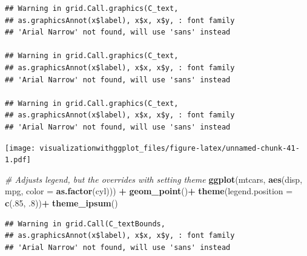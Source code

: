\documentclass[]{krantz}
\makeatletter
\newenvironment{Shaded}{\begin{snugshade}}{\end{snugshade}}
\newcommand{\CommentTok}[1]{\textcolor[rgb]{0.56,0.35,0.01}{\textit{#1}}}
\newcommand{\DataTypeTok}[1]{\textcolor[rgb]{0.13,0.29,0.53}{#1}}
\newcommand{\DecValTok}[1]{\textcolor[rgb]{0.00,0.00,0.81}{#1}}
\newcommand{\FloatTok}[1]{\textcolor[rgb]{0.00,0.00,0.81}{#1}}
\newcommand{\KeywordTok}[1]{\textcolor[rgb]{0.13,0.29,0.53}{\textbf{#1}}}
\newcommand{\NormalTok}[1]{#1}
\newcommand{\OperatorTok}[1]{\textcolor[rgb]{0.81,0.36,0.00}{\textbf{#1}}}
\newcommand{\StringTok}[1]{\textcolor[rgb]{0.31,0.60,0.02}{#1}}
\newenvironment{kframe}{%
\medskip{}
\setlength{\fboxsep}{.8em}
 \def\at@end@of@kframe{}%
 \ifinner\ifhmode%
  \def\at@end@of@kframe{\end{minipage}}%
  \begin{minipage}{\columnwidth}%
 \fi\fi%
 \def\FrameCommand##1{\hskip\@totalleftmargin \hskip-\fboxsep
 \colorbox{shadecolor}{##1}\hskip-\fboxsep
     \hskip-\linewidth \hskip-\@totalleftmargin \hskip\columnwidth}%
 \MakeFramed {\advance\hsize-\width
   \@totalleftmargin\z@ \linewidth\hsize
   \@setminipage}}%
 {\par\unskip\endMakeFramed%
 \at@end@of@kframe}
\renewenvironment{Shaded}{\begin{kframe}}{\end{kframe}}
\makeatother
\begin{document}
\begin{verbatim}
## Warning in grid.Call.graphics(C_text,
## as.graphicsAnnot(x$label), x$x, x$y, : font family
## 'Arial Narrow' not found, will use 'sans' instead

## Warning in grid.Call.graphics(C_text,
## as.graphicsAnnot(x$label), x$x, x$y, : font family
## 'Arial Narrow' not found, will use 'sans' instead

## Warning in grid.Call.graphics(C_text,
## as.graphicsAnnot(x$label), x$x, x$y, : font family
## 'Arial Narrow' not found, will use 'sans' instead
\end{verbatim}

\texttt{[image: visualizationwithggplot\_files/figure-latex/unnamed-chunk-41-1.pdf]}

\begin{Shaded}
\begin{Highlighting}[]
\CommentTok{# Adjusts legend, but the overrides with setting theme }
\KeywordTok{ggplot}\NormalTok{(mtcars, }\KeywordTok{aes}\NormalTok{(disp,  mpg, }\DataTypeTok{color =} \KeywordTok{as.factor}\NormalTok{(cyl))) }\OperatorTok{+}\StringTok{ }\KeywordTok{geom_point}\NormalTok{()}\OperatorTok{+}\StringTok{ }
\StringTok{  }\KeywordTok{theme}\NormalTok{(}\DataTypeTok{legend.position =} \KeywordTok{c}\NormalTok{(.}\DecValTok{85}\NormalTok{, }\FloatTok{.8}\NormalTok{))}\OperatorTok{+}
\StringTok{  }\KeywordTok{theme_ipsum}\NormalTok{()}
\end{Highlighting}
\end{Shaded}

\begin{verbatim}
## Warning in grid.Call(C_textBounds,
## as.graphicsAnnot(x$label), x$x, x$y, : font family
## 'Arial Narrow' not found, will use 'sans' instead
\end{verbatim}
\end{document}
